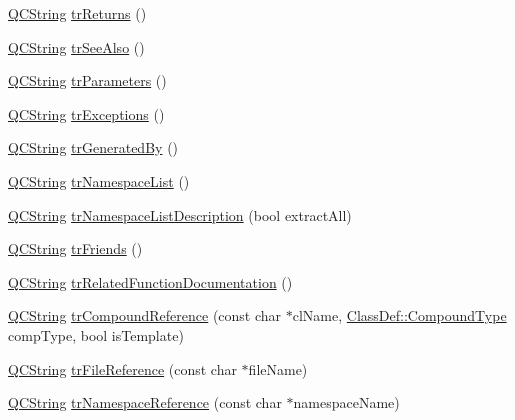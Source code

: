 \begin{DoxyCompactItemize}
\item 
\mbox{\hyperlink{class_q_c_string}{Q\+C\+String}} \mbox{\hyperlink{class_translator_italian_a402fc7befaa1e75811a6686df59f64a2}{tr\+Returns}} ()
\item 
\mbox{\hyperlink{class_q_c_string}{Q\+C\+String}} \mbox{\hyperlink{class_translator_italian_af113e12bf13877fd4f58037df2c96ae1}{tr\+See\+Also}} ()
\item 
\mbox{\hyperlink{class_q_c_string}{Q\+C\+String}} \mbox{\hyperlink{class_translator_italian_aea49d52a8a5fb2f7018bea9eb489f507}{tr\+Parameters}} ()
\item 
\mbox{\hyperlink{class_q_c_string}{Q\+C\+String}} \mbox{\hyperlink{class_translator_italian_a031a42a99a64a7c806bd6ce0c26e65e6}{tr\+Exceptions}} ()
\item 
\mbox{\hyperlink{class_q_c_string}{Q\+C\+String}} \mbox{\hyperlink{class_translator_italian_a3e56a91fa81539a017863f6ef9d4b5d6}{tr\+Generated\+By}} ()
\item 
\mbox{\hyperlink{class_q_c_string}{Q\+C\+String}} \mbox{\hyperlink{class_translator_italian_a3c1e6c0da10511984e141019a7b8fc39}{tr\+Namespace\+List}} ()
\item 
\mbox{\hyperlink{class_q_c_string}{Q\+C\+String}} \mbox{\hyperlink{class_translator_italian_afbe98c322ec04c2abeb7f6285a5820ea}{tr\+Namespace\+List\+Description}} (bool extract\+All)
\item 
\mbox{\hyperlink{class_q_c_string}{Q\+C\+String}} \mbox{\hyperlink{class_translator_italian_a0d67545dafd0468934dc6b10a3dc5fad}{tr\+Friends}} ()
\item 
\mbox{\hyperlink{class_q_c_string}{Q\+C\+String}} \mbox{\hyperlink{class_translator_italian_aaf7223507091afa2feb47872a7cf6d4d}{tr\+Related\+Function\+Documentation}} ()
\item 
\mbox{\hyperlink{class_q_c_string}{Q\+C\+String}} \mbox{\hyperlink{class_translator_italian_abfa7be36cc267c88e65de4a1f09917ee}{tr\+Compound\+Reference}} (const char $\ast$cl\+Name, \mbox{\hyperlink{class_class_def_ae70cf86d35fe954a94c566fbcfc87939}{Class\+Def\+::\+Compound\+Type}} comp\+Type, bool is\+Template)
\item 
\mbox{\hyperlink{class_q_c_string}{Q\+C\+String}} \mbox{\hyperlink{class_translator_italian_aa335f444123ee1e447559746c8a41cd1}{tr\+File\+Reference}} (const char $\ast$file\+Name)
\item 
\mbox{\hyperlink{class_q_c_string}{Q\+C\+String}} \mbox{\hyperlink{class_translator_italian_a5d22c0f0c87bf72f003f810a5e528957}{tr\+Namespace\+Reference}} (const char $\ast$namespace\+Name)

\end{DoxyCompactItemize}
